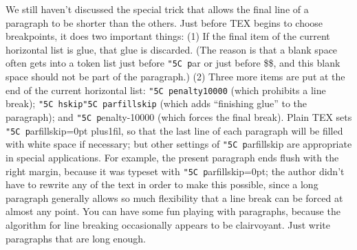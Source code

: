 \def\\#1{{\tt \char"5C #1}}

We still haven’t discussed the special trick that allows the final line of a
paragraph to be shorter than the others.
Just before TEX begins to choose
breakpoints, it does two important things: (1) If the final item of the current horizontal
list is glue, that glue is discarded. 
(The reason is that a blank space often gets into a
token list just before \\par or just before \$\$, 
and this blank space should not be part
of the paragraph.) 
(2) Three more items are put at the end of the current horizontal
list: \\{penalty10000} (which prohibits a line break); \\{hskip\\parfillskip} (which adds
“finishing glue” to the paragraph);
and \\penalty-10000 (which forces the final break).
Plain TEX sets \\parfillskip=0pt plus1fil,
so that the last line of each paragraph will
be filled with white space if necessary;
but other settings of \\parfillskip are appropriate in special applications.
For example, the present paragraph ends flush with the
right margin, because it was typeset with \\parfillskip=0pt; the author didn’t have to
rewrite any of the text in order to make this possible, since a long paragraph generally
allows so much flexibility that a line break can be forced at almost any point. You
can have some fun playing with paragraphs, because the algorithm for line breaking
occasionally appears to be clairvoyant. Just write paragraphs that are long enough.

